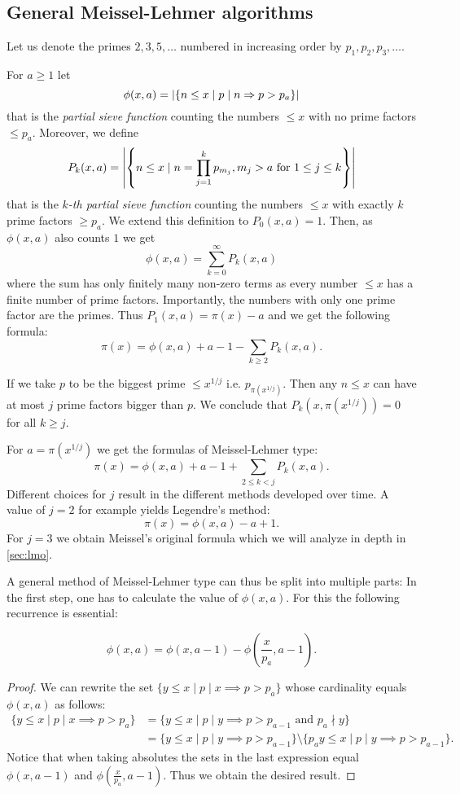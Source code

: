 \subsection{General Meissel-Lehmer algorithms}
\begin{definition}
Let us denote the primes $2,3,5,\ldots$ numbered in increasing order by $p_1,p_2,p_3,\ldots$.

For $a \geq 1$ let
\[
	\phi(x,a) = \abs{\{n \leq x \mid p \mid n \Rightarrow p > p_{a}\}}
\] 
that is the \emph{partial sieve function} counting the numbers $\leq x$ with no prime factors $\leq p_{a}$.
Moreover, we define 
\[
	P_{k}(x,a) = \abs{\left\{n \leq x \mid n = \prod_{j=1}^{k} p_{m_{j}}, m_{j} > a \text{ for } 1 \leq j \leq k\right\} }
\] 
that is the \emph{$k$-th partial sieve function} counting the numbers $\leq x$ with exactly $k$ prime factors $\geq p_{a}$.
We extend this definition to $P_{0}(x,a) = 1$. Then, as $\phi(x,a)$ also counts $1$ we get
\[
	\phi(x,a) = \sum_{k=0}^{\infty} P_{k}(x,a)
\] 
where the sum has only finitely many non-zero terms as every number $\leq x$ has a finite number of prime factors.
Importantly, the numbers with only one prime factor are the primes. Thus $P_{1}(x,a) = \pi(x) - a$ and we get the following formula:
\[
	\pi(x) = \phi(x,a) +a - 1 - \sum_{k \geq 2} P_{k}(x,a)  
.\] 
\end{definition}
If we take $p$ to be the biggest prime $\leq x^{1 / j}$ i.e. $p_{\pi(x^{1 / j})}$.
Then any $n \leq x$ can have at most $j$ prime factors bigger than $p$. We conclude that $P_{k}(x,\pi(x^{1 / j})) = 0$ for all $k \geq j$.

For $a = \pi(x^{1 / j})$ we get the formulas of Meissel-Lehmer type:
\[
	\pi(x) = \phi(x,a) + a - 1 + \sum_{2 \leq k < j} P_{k}(x,a) 
.\] 
Different choices for $j$ result in the different methods developed over time.
A value of $j=2$ for example yields Legendre's method:
\[
	\pi(x) = \phi(x,a) -a +1
.\]
For $j=3$ we obtain Meissel's original formula which we will analyze in depth in \ref{sec:lmo}.

A general method of Meissel-Lehmer type can thus be split into multiple parts:
In the first step, one has to calculate the value of $\phi(x,a)$. For this the following recurrence is essential:
\begin{lemma}
	 \[
		 \phi(x,a) = \phi(x,a-1) - \phi\left(\frac{x}{p_{a}}, a-1\right)
	.\] 
\end{lemma}

\begin{proof}
	We can rewrite the set $\{y \leq x \mid p \mid x \implies p > p_{a}\}$ whose cardinality equals $\phi(x,a)$ as follows:
	\begin{align*}
		\{y \leq x \mid p \mid x \implies p > p_{a}\} &= \{y \leq x \mid p \mid y \implies p > p_{a-1} \text{ and } p_{a} \nmid y\}\\
		&=  \{y \leq x \mid p \mid y \implies p > p_{a-1}\} \setminus \{p_{a}y \leq x \mid p \mid y \implies p > p_{a-1}\}
	.\end{align*}
	Notice that when taking absolutes the sets in the last expression equal $\phi(x,a-1)$ and $\phi(\frac{x}{p_{a}},a-1)$.
	Thus we obtain the desired result.
\end{proof}


